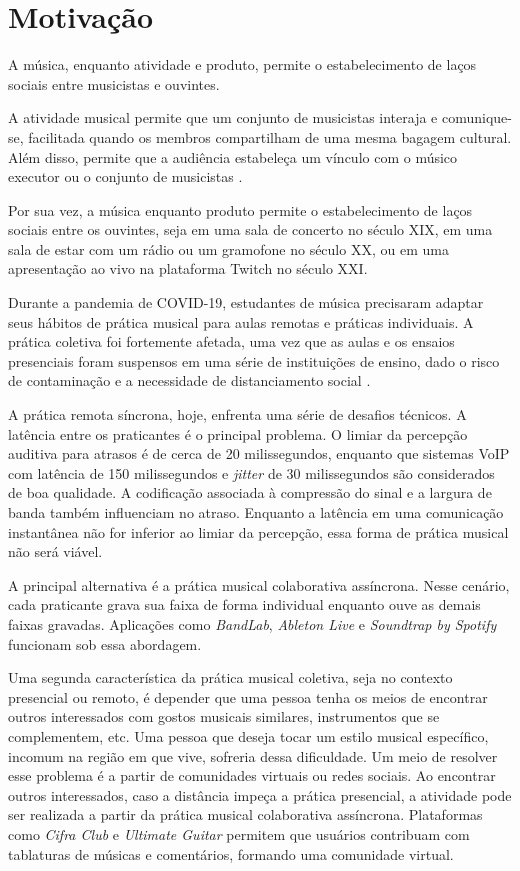 \section{Motivação}

A música, enquanto atividade e produto, permite o estabelecimento de laços sociais
entre musicistas e ouvintes.

A atividade musical permite que um conjunto de musicistas interaja e
comunique-se, facilitada quando os membros compartilham de uma mesma bagagem
cultural. Além disso, permite que a audiência estabeleça um vínculo com
o músico executor ou o conjunto de musicistas \cite{cook2021music}.

Por sua vez, a música enquanto produto permite o estabelecimento de laços sociais
entre os ouvintes, seja em uma sala de concerto no século XIX, em uma sala de estar
com um rádio ou um gramofone no século XX, ou em uma apresentação ao vivo na
plataforma Twitch no século XXI.

Durante a pandemia de COVID-19, estudantes de música precisaram adaptar seus
hábitos de prática musical para aulas remotas e práticas individuais. A prática
coletiva foi fortemente afetada, uma vez que as aulas e os ensaios presenciais
foram suspensos em uma série de instituições de ensino, dado o risco de
contaminação e a necessidade de distanciamento social \cite{nusseck2021musical}.

A prática remota síncrona, hoje, enfrenta uma série de desafios técnicos. A
latência entre os praticantes é o principal problema. O limiar da percepção
auditiva para atrasos é de cerca de 20 milissegundos, enquanto que sistemas VoIP
com latência de 150 milissegundos e \textit{jitter} de 30 milissegundos são
considerados de boa qualidade. A codificação associada à compressão do sinal e a
largura de banda também influenciam no atraso. Enquanto a latência em uma
comunicação instantânea não for inferior ao limiar da percepção, essa forma de
prática musical não será viável.

A principal alternativa é a prática musical colaborativa assíncrona. Nesse
cenário, cada praticante grava sua faixa de forma individual enquanto ouve as
demais faixas gravadas. Aplicações como \textit{BandLab}, \textit{Ableton Live}
e \textit{Soundtrap by Spotify} funcionam sob essa abordagem.

Uma segunda característica da prática musical coletiva, seja no contexto
presencial ou remoto, é depender que uma pessoa tenha os meios de encontrar
outros interessados com gostos musicais similares, instrumentos que se
complementem, etc. Uma pessoa que deseja tocar um estilo musical específico,
incomum na região em que vive, sofreria dessa dificuldade. Um meio de resolver
esse problema é a partir de comunidades virtuais ou redes sociais. Ao encontrar
outros interessados, caso a distância impeça a prática presencial, a atividade
pode ser realizada a partir da prática musical colaborativa assíncrona.
Plataformas como \textit{Cifra Club} e \textit{Ultimate Guitar} permitem que
usuários contribuam com tablaturas de músicas e comentários, formando uma
comunidade virtual.


